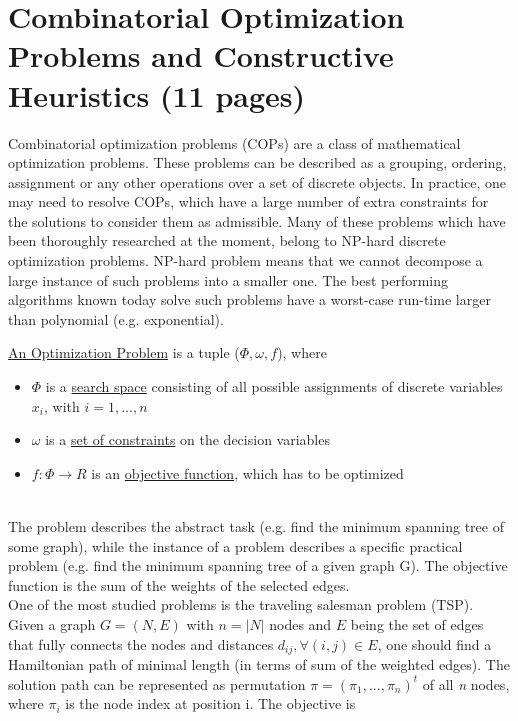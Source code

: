 \section{Combinatorial Optimization Problems and Constructive
Heuristics (11 pages)}

Combinatorial optimization problems (COPs) are a class of mathematical optimization problems. These problems can be described as a grouping, ordering, assignment or any other operations over a set of discrete objects. In practice, one may need to resolve COPs, which have a large number of extra constraints for the solutions to consider them as admissible. Many of these problems which have been thoroughly researched at the moment, belong to NP-hard discrete optimization problems. NP-hard problem means that we cannot decompose a large instance of such problems into a smaller one. The best performing algorithms known today solve such problems have a worst-case run-time larger than polynomial (e.g. exponential).

\begin{minipage}[c, breaklines=true]{0.95\textwidth}
\begin{definition}
	\underline{An Optimization Problem} is a tuple ($\Phi,\omega, f$), where
	\begin{itemize}
		\item{$\Phi$ is a \underline{search space} consisting of all possible assignments of discrete variables $x_i$, with $i=1,...,n$ }
		\item{$\omega$ is a \underline{set of constraints} on the decision variables}
		\item{$f:\Phi \to R$ is an \underline{objective function}, which has to be optimized}
	\end{itemize}
\end{definition}
\end{minipage} \\

The problem describes the abstract task (e.g. find the minimum spanning tree of some graph), while the instance of a problem describes a specific practical problem (e.g. find the minimum spanning tree of a given graph G). The objective function is the sum of the weights of the selected edges. \\
One of the most studied problems is the traveling salesman problem (TSP). Given a graph $G=(N,E)$ with $n=|N|$ nodes and $E$ being the set of edges that fully connects the nodes and distances $d_{ij}, \forall(i,j) \in E$, one should find a Hamiltonian path of minimal length (in terms of sum of the weighted edges). The solution path can be represented as permutation $\pi=(\pi_1,...,\pi_n)^t$ of all \emph{n} nodes, where $\pi_i$ is the node index at position i. The objective is


